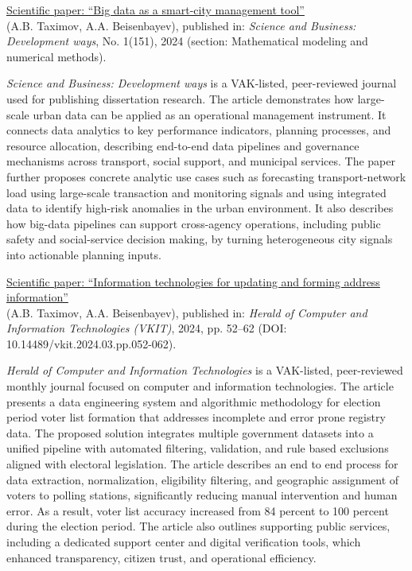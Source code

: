 \noindent\underline{Scientific paper: ``Big data as a smart-city management tool''} \\
(A.B. Taximov, A.A. Beisenbayev), published in: \emph{Science and Business: Development ways}, No. 1(151), 2024 (section: Mathematical modeling and numerical methods).

\emph{Science and Business: Development ways} is a VAK-listed, peer-reviewed journal used for publishing dissertation research. The article demonstrates how large-scale urban data can be applied as an operational management instrument. It connects data analytics to key performance indicators, planning processes, and resource allocation, describing end-to-end data pipelines and governance mechanisms across transport, social support, and municipal services. The paper further proposes concrete analytic use cases such as forecasting transport-network load using large-scale transaction and monitoring signals and using integrated data to identify high-risk anomalies in the urban environment. It also describes how big-data pipelines can support cross-agency operations, including public safety and social-service decision making, by turning heterogeneous city signals into actionable planning inputs.
\bigskip

\noindent\underline{Scientific paper: ``Information technologies for updating and forming address information''} \\
(A.B. Taximov, A.A. Beisenbayev), published in: \emph{Herald of Computer and Information Technologies (VKIT)}, 2024, pp. 52–62 (DOI: 10.14489/vkit.2024.03.pp.052-062).

\emph{Herald of Computer and Information Technologies} is a VAK-listed, peer-reviewed monthly journal focused on computer and information technologies. The article presents a data engineering system and algorithmic methodology for election period voter list formation that addresses incomplete and error prone registry data. The proposed solution integrates multiple government datasets into a unified pipeline with automated filtering, validation, and rule based exclusions aligned with electoral legislation. The article describes an end to end process for data extraction, normalization, eligibility filtering, and geographic assignment of voters to polling stations, significantly reducing manual intervention and human error. As a result, voter list accuracy increased from 84 percent to 100 percent during the election period. The article also outlines supporting public services, including a dedicated support center and digital verification tools, which enhanced transparency, citizen trust, and operational efficiency.
\bigskip

